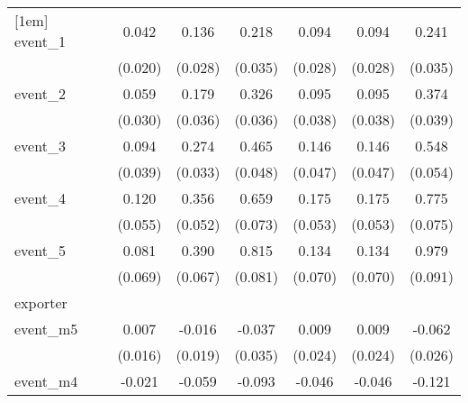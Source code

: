 {\begin{tabular}{l*{6}{c}}
[1em]
event\_1     &       0.042\sym{*}  &       0.136\sym{***}&       0.218\sym{***}&       0.094\sym{***}&       0.094\sym{***}&       0.241\sym{***}\\
            &     (0.020)         &     (0.028)         &     (0.035)         &     (0.028)         &     (0.028)         &     (0.035)         \\
[1em]
event\_2     &       0.059         &       0.179\sym{***}&       0.326\sym{***}&       0.095\sym{*}  &       0.095\sym{*}  &       0.374\sym{***}\\
            &     (0.030)         &     (0.036)         &     (0.036)         &     (0.038)         &     (0.038)         &     (0.039)         \\
[1em]
event\_3     &       0.094\sym{*}  &       0.274\sym{***}&       0.465\sym{***}&       0.146\sym{**} &       0.146\sym{**} &       0.548\sym{***}\\
            &     (0.039)         &     (0.033)         &     (0.048)         &     (0.047)         &     (0.047)         &     (0.054)         \\
[1em]
event\_4     &       0.120\sym{*}  &       0.356\sym{***}&       0.659\sym{***}&       0.175\sym{***}&       0.175\sym{***}&       0.775\sym{***}\\
            &     (0.055)         &     (0.052)         &     (0.073)         &     (0.053)         &     (0.053)         &     (0.075)         \\
[1em]
event\_5     &       0.081         &       0.390\sym{***}&       0.815\sym{***}&       0.134         &       0.134         &       0.979\sym{***}\\
            &     (0.069)         &     (0.067)         &     (0.081)         &     (0.070)         &     (0.070)         &     (0.091)         \\
\hline
exporter    &                     &                     &                     &                     &                     &                     \\
event\_m5    &       0.007         &      -0.016         &      -0.037         &       0.009         &       0.009         &      -0.062\sym{*}  \\
            &     (0.016)         &     (0.019)         &     (0.035)         &     (0.024)         &     (0.024)         &     (0.026)         \\
[1em]
event\_m4    &      -0.021         &      -0.059\sym{**} &      -0.093\sym{**} &      -0.046         &      -0.046         &      -0.121\sym{***}\\

\end{tabular}}
